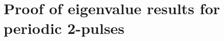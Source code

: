 \documentclass[11pt,reqno,oneside]{report}
\theoremstyle{plain}
\theoremstyle{definition}
\theoremstyle{remark}
\numberwithin{section}{chapter}
\numberwithin{equation}{chapter}
\numberwithin{figure}{chapter}
\begin{document}
\chapter{Proof of eigenvalue results for periodic 2-pulses}\label{per2pproof}


% 

\begin{spacing}{1} 


\end{spacing}

\end{document}
